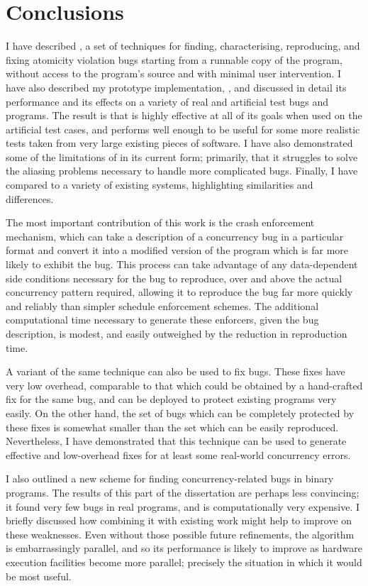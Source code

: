 \chapter{Conclusions}
\label{sect:concl}

I have described {\technique}, a set of techniques for finding,
characterising, reproducing, and fixing atomicity violation bugs
starting from a runnable copy of the program, without access to the
program's source and with minimal user intervention.  I have also
described my prototype implementation, {\implementation}, and
discussed in detail its performance and its effects on a variety of
real and artificial test bugs and programs.  The result is that
{\technique} is highly effective at all of its goals when used on the
artificial test cases, and performs well enough to be useful for some
more realistic tests taken from very large existing pieces of
software.  I have also demonstrated some of the limitations of
{\technique} in its current form; primarily, that it struggles to
solve the aliasing problems necessary to handle more complicated bugs.
Finally, I have compared {\technique} to a variety of existing
systems, highlighting similarities and differences.

The most important contribution of this work is the crash enforcement
mechanism, which can take a description of a concurrency bug in a
particular format and convert it into a modified version of the
program which is far more likely to exhibit the bug.  This process can
take advantage of any data-dependent side conditions necessary for the
bug to reproduce, over and above the actual concurrency pattern
required, allowing it to reproduce the bug far more quickly and
reliably than simpler schedule enforcement schemes.  The additional
computational time necessary to generate these enforcers, given the
bug description, is modest, and easily outweighed by the reduction in
reproduction time.

A variant of the same technique can also be used to fix bugs.  These
fixes have very low overhead, comparable to that which could be
obtained by a hand-crafted fix for the same bug, and can be deployed
to protect existing programs very easily.  On the other hand, the set
of bugs which can be completely protected by these fixes is somewhat
smaller than the set which can be easily reproduced.  Nevertheless, I
have demonstrated that this technique can be used to generate
effective and low-overhead fixes for at least some real-world
concurrency errors.

I also outlined a new scheme for finding concurrency-related bugs in
binary programs.  The results of this part of the dissertation are
perhaps less convincing; it found very few bugs in real programs, and
is computationally very expensive.  I briefly discussed how combining
it with existing work might help to improve on these weaknesses.  Even
without those possible future refinements, the algorithm is
embarrassingly parallel, and so its performance is likely to improve
as hardware execution facilities become more parallel; precisely the
situation in which it would be most useful.
